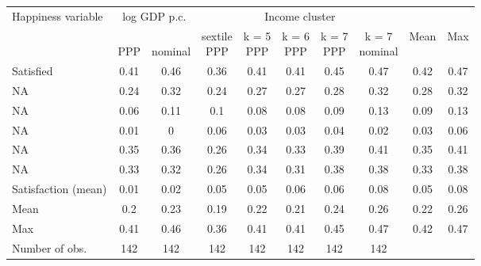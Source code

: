 
\begin{tabular}[t]{lccccccccc}
\toprule Happiness variable & \multicolumn{2}{c}{log GDP p.c.} & \multicolumn{5}{c}{Income cluster} & & \\
  & \makecell{\,\\PPP} & \makecell{\,\\nominal} & \makecell{sextile\\PPP} & \makecell{k = 5\\PPP} & \makecell{k = 6\\PPP} & \makecell{k = 7\\PPP} & \makecell{k = 7\\nominal} & Mean & Max\\
\midrule
Satisfied & 0.41 & 0.46 & 0.36 & 0.41 & 0.41 & 0.45 & 0.47 & 0.42 & 0.47\\
NA & 0.24 & 0.32 & 0.24 & 0.27 & 0.27 & 0.28 & 0.32 & 0.28 & 0.32\\
NA & 0.06 & 0.11 & 0.1 & 0.08 & 0.08 & 0.09 & 0.13 & 0.09 & 0.13\\
NA & 0.01 & 0 & 0.06 & 0.03 & 0.03 & 0.04 & 0.02 & 0.03 & 0.06\\
NA & 0.35 & 0.36 & 0.26 & 0.34 & 0.33 & 0.39 & 0.41 & 0.35 & 0.41\\
NA & 0.33 & 0.32 & 0.26 & 0.34 & 0.31 & 0.38 & 0.38 & 0.33 & 0.38\\
Satisfaction (mean) & 0.01 & 0.02 & 0.05 & 0.05 & 0.06 & 0.06 & 0.08 & 0.05 & 0.08\\ \midrule 
Mean & 0.2 & 0.23 & 0.19 & 0.22 & 0.21 & 0.24 & 0.26 & 0.22 & 0.26\\
Max & 0.41 & 0.46 & 0.36 & 0.41 & 0.41 & 0.45 & 0.47 & 0.42 & 0.47\\ \midrule 
Number of obs. & 142 & 142 & 142 & 142 & 142 & 142 & 142 &  & \\
\bottomrule
\end{tabular}